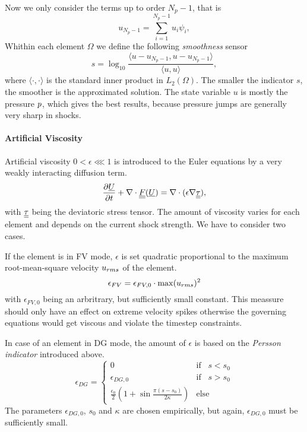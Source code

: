 Now we only consider the terms up to order $N_p-1$, that is
\begin{equation}
    u_{N_p-1} = \sum^{N_p-1}_{i=1} u_i \psi_i,
\end{equation}
Whithin each element $\Omega$ we define the following \emph{smoothness} sensor
\begin{equation}
\label{eqn:smoothness-indicator}
    s = \log_{10} \frac{\langle u - u_{N_p-1}, u - u_{N_p-1} \rangle}{\langle u, u \rangle},
\end{equation}
where $\langle \cdot,\cdot \rangle$ is the standard inner product in $L_2(\Omega)$.
The smaller the indicator $s$, the smoother is the approximated solution.
The state variable $u$ is mostly the pressure $p$, which gives the best
results, because pressure jumps are generally very sharp in shocks.

\paragraph{Artificial Viscosity}
Artificial viscosity $0 < \epsilon \lll 1$ is introduced to the Euler equations
by a very weakly interacting diffusion term.
\begin{equation}
\label{eqn:persson-indicator-gov-equ}
    \frac{\partial\underline{U}}{\partial t} + \nabla \cdot \underline{\underline{F}}(\underline{U}) = \nabla \cdot (\epsilon \nabla \underline{\underline{\tau}}),
\end{equation}
with $\underline{\underline{\tau}}$ being the deviatoric stress tensor. The amount of viscosity
varies for each element and depends on the current shock strength.
We have to consider two cases.

If the element is in FV mode, $\epsilon$ is set quadratic proportional to the
maximum root-mean-square velocity $u_{rms}$ of the element.
\begin{equation}
    \epsilon_{FV} = \epsilon_{FV,0} \cdot \max(u_{rms})^2
\end{equation}
with $\epsilon_{FV,0}$ being an arbritrary, but sufficiently small constant.
This meassure should only have an effect on extreme velocity spikes otherwise
the governing equations would get viscous and violate the timestep constraints.

In case of an element in DG mode, the amount of $\epsilon$ is based on the
\emph{Persson indicator} introduced above.
\begin{equation}
    \epsilon_{DG} = \begin{cases}
        0 & \text{if}\;\;\; s < s_0 \\
        \epsilon_{DG,0} & \text{if}\;\;\; s > s_0 \\
        \frac{\epsilon_0}{2} \left ( 1 + \sin\frac{\pi(s-s_0)}{2\kappa} \right ) & \text{else}
    \end{cases}
\end{equation}
The parameters $\epsilon_{DG,0}$, $s_0$ and $\kappa$ are chosen empirically,
but again, $\epsilon_{DG,0}$ must be sufficiently small.

